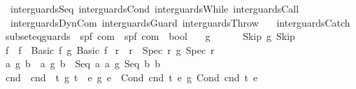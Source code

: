 \begin{isabellebody}
\ \ inter{\isacharunderscore}guards{\isacharunderscore}Seq\ inter{\isacharunderscore}guards{\isacharunderscore}Cond\ inter{\isacharunderscore}guards{\isacharunderscore}While\ inter{\isacharunderscore}guards{\isacharunderscore}Call\isanewline
\ \ inter{\isacharunderscore}guards{\isacharunderscore}DynCom\ inter{\isacharunderscore}guards{\isacharunderscore}Guard\ inter{\isacharunderscore}guards{\isacharunderscore}Throw\ \isanewline
\ \ inter{\isacharunderscore}guards{\isacharunderscore}Catch%
\isamarkuptrue%
\isamarkupfalse%
\ subseteq{\isacharunderscore}guards\ {\isacharcolon}{\isacharcolon}\ {\isachardoublequoteopen}{\isacharparenleft}{\isacharprime}s{\isacharcomma}{\isacharprime}p{\isacharcomma}{\isacharprime}f{\isacharparenright}\ com\ {\isasymRightarrow}\ {\isacharparenleft}{\isacharprime}s{\isacharcomma}{\isacharprime}p{\isacharcomma}{\isacharprime}f{\isacharparenright}\ com\ {\isasymRightarrow}\ bool{\isachardoublequoteclose}\isanewline
\ \ {\isacharparenleft}{\isachardoublequoteopen}{\isacharunderscore}\ {\isasymsubseteq}\isactrlsub g\ {\isacharunderscore}{\isachardoublequoteclose}\ {\isacharbrackleft}{}{}{\isacharcomma}{}{}{\isacharbrackright}\ {}{}{\isacharparenright}\ \isanewline
\ \ {\isachardoublequoteopen}Skip\ {\isasymsubseteq}\isactrlsub g\ Skip{\isachardoublequoteclose}\isanewline
{\isacharbar}\ {\isachardoublequoteopen}f{}\ {\isacharequal}\ f{}\ {\isasymLongrightarrow}\ Basic\ f{}\ {\isasymsubseteq}\isactrlsub g\ Basic\ f{}{\isachardoublequoteclose}\isanewline
{\isacharbar}\ {\isachardoublequoteopen}r{}\ {\isacharequal}\ r{}\ {\isasymLongrightarrow}\ Spec\ r{}\ {\isasymsubseteq}\isactrlsub g\ Spec\ r{}{\isachardoublequoteclose}\isanewline
{\isacharbar}\ {\isachardoublequoteopen}a{}\ {\isasymsubseteq}\isactrlsub g\ b{}\ {\isasymLongrightarrow}\ a{}\ {\isasymsubseteq}\isactrlsub g\ b{}\ {\isasymLongrightarrow}\ Seq\ a{}\ a{}\ {\isasymsubseteq}\isactrlsub g\ Seq\ b{}\ b{}{\isachardoublequoteclose}\isanewline
{\isacharbar}\ {\isachardoublequoteopen}cnd{}\ {\isacharequal}\ cnd{}\ {\isasymLongrightarrow}\ t{}\ {\isasymsubseteq}\isactrlsub g\ t{}\ {\isasymLongrightarrow}\ e{}\ {\isasymsubseteq}\isactrlsub g\ e{}\ {\isasymLongrightarrow}\ Cond\ cnd{}\ t{}\ e{}\ {\isasymsubseteq}\isactrlsub g\ Cond\ cnd{}\ t{}\ e{}{\isachardoublequoteclose}\isanewline

\end{isabellebody}
